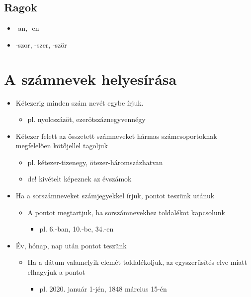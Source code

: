 \documentclass{article}
\begin{document}
\subsection{Ragok}
\begin{itemize}
    \item -an, -en
    \item -szor, -szer, -ször
\end{itemize}

\section{A számnevek helyesírása}
\begin{itemize}
    \item Kétezerig minden szám nevét egybe írjuk.
    \begin{itemize}
        \item pl. nyolcszázöt, ezerötszáznegyvennégy
    \end{itemize}
    \item Kétezer felett az összetett számneveket hármas számcsoportoknak megfelelően kötőjellel tagoljuk
    \begin{itemize}
        \item pl. kétezer-tizenegy, ötezer-háromszázhatvan
        \item de! kivételt képeznek az évszámok
    \end{itemize}
    \item Ha a sorszámneveket számjegyekkel írjuk, pontot teszünk utánuk
    \begin{itemize}
        \item A pontot megtartjuk, ha sorszámnevekhez toldalékot kapcsolunk
        \begin{itemize}
            \item pl. 6.-ban, 10.-be, 34.-en
        \end{itemize}
    \end{itemize}
    \item Év, hónap, nap után pontot teszünk
    \begin{itemize}
        \item Ha a dátum valamelyik elemét toldalékoljuk, az egyszerűsítés elve miatt elhagyjuk a pontot
        \begin{itemize}
            \item pl. 2020. január 1-jén, 1848 március 15-én
        \end{itemize}
    \end{itemize}
\end{itemize}
\end{document}
